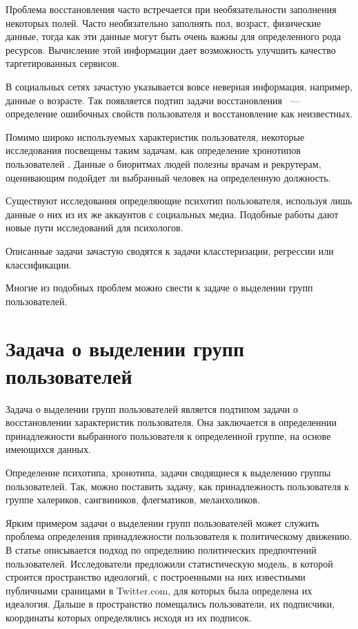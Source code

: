 \documentclass[annotation,times,page4]{itmo-student-thesis}
\begin{document}
Проблема восстановления часто встречается при необязательности заполнения некоторых полей. Часто необязательно заполнять пол, возраст, физические данные, тогда как эти данные могут быть очень важны для определенного рода ресурсов\cite{peersman2011predicting, turdakov2013opredelenie, schwartz2013personality}. Вычисление этой информации дает возможность улучшить качество таргетированных сервисов.

В социальных сетях зачастую указывается вовсе неверная информация, например, данные о возрасте. Так появляется подтип задачи восстановления ~--- определение ошибочных свойств пользователя и восстановление как неизвестных.

Помимо широко используемых характеристик пользователя, некоторые исследования посвещены таким задачам, как определение хронотипов пользователей \cite{blachnio2015facebook}. Данные о биоритмах людей полезны врачам и рекрутерам, оценивающим подойдет ли выбранный человек на определенную должность.

Существуют исследования определяющие психотип пользователя, используя лишь данные о них из их же аккаунтов с социальных медиа\cite{schwartz2013personality}. Подобные работы дают новые пути исследований для психологов.

Описанные задачи зачастую сводятся к задачи класстеризации, регрессии или классификации.

Многие из подобных проблем можно свести к задаче о выделении групп пользователей.    

 
\section{Задача о выделении групп пользователей}
Задача о выделении групп пользователей является подтипом задачи о восстановлении характеристик пользователя. Она заключается в определеннии принадлежности выбранного пользователя к определенной группе, на основе имеющихся данных. 

Определение психотипа, хронотипа, задачи сводящиеся к выделению группы пользователей. Так, можно поставить задачу, как принадлежность пользователя к группе халериков, сангвиников, флегматиков, меланхоликов.

Ярким примером задачи о выделении групп пользователей может служить проблема определения принадлежности пользователя к политическому движению\cite{barbera2015tweeting, yardi2010dynamic, lo2014common, bonica2013ideology, gruzd2014investigating}. В статье \cite{barbera2015tweeting} описывается подход по определнию политических предпочтений пользователей. Исследователи предложили статистическую модель, в которой строится пространство идеологий, с построенными на них известными публичными сраницами в Twitter.com, для которых была определена их идеалогия. Дальше в пространство помещались пользователи, их подписчики, координаты которых определялись исходя из их подписок.
\end{document}
